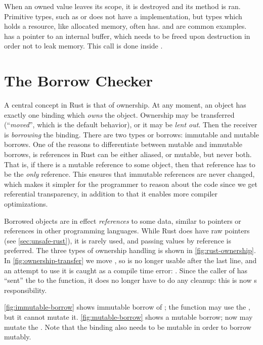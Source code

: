 When an owned value leaves its scope, it is destroyed and its  method is ran. Primitive
types, such as  or  does not have a  implementation, but types
which holds a resource, like allocated memory, often has.   and  are
common examples.  has a pointer to an internal buffer, which needs to be freed upon
destruction in order not to leak memory. This  call is done inside .


\section{The Borrow Checker\label{sec:borrow-checker}}

A central concept in Rust is that of ownership. At any moment, an object has exactly one binding
which \emph{owns} the object. Ownership may be transferred (``\emph{moved}'', which is the default
behavior), or it may be \emph{lent out}. Then the receiver is \emph{borrowing} the binding.
There are two types or borrows: immutable and mutable borrows.
One of the reasons to differentiate between mutable and immutable borrows, is references in Rust
can be either aliased, or mutable, but never both.  That is, if there is a mutable reference to
some object, then that reference has to be the \emph{only} reference. This ensures that immutable
references are never changed, which makes it simpler for the programmer to reason about the code
since we get referential transparency, in addition to that it enables more compiler optimizations.

Borrowed objects are in effect \emph{references} to some data, similar to pointers or references
in other programming languages. While Rust does have raw pointers (see \cref{sec:unsafe-rust}), it
is rarely used, and passing values by reference is preferred.  The three types of ownership handling
is shown in \cref{fig:rust-ownership}. In \cref{fig:ownership-transfer} we move , so
 is no longer usable after the last line, and an attempt to use it is caught as a compile
time error: . Since the caller of  has
``sent'' the  to the function, it does no longer have to do any cleanup: this is now
s responsibility.

\cref{fig:immutable-borrow} shows immutable borrow of ; the function  may use the
, but it cannot mutate it. \cref{fig:mutable-borrow} shows a mutable borrow; now
 may mutate the . Note that the binding  also needs to be mutable in
order to borrow mutably.

